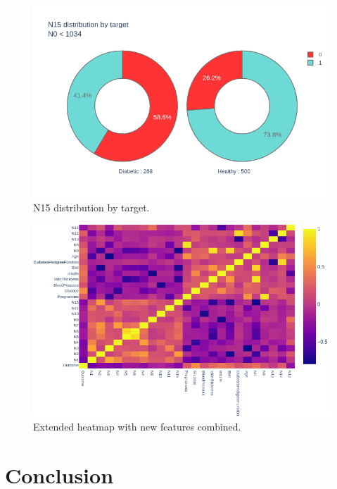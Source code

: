 \documentclass[12pt]{article}
\begin{document}
\begin{figure}[ht]
\centering
\includegraphics[width=1\textwidth]{newplot(41).png}
\caption{\label{fig:48} N15 distribution by target.}
\end{figure}

\begin{figure}[ht]
\centering
\includegraphics[width=1\textwidth]{newplot(42).png}
\caption{\label{fig:49} Extended heatmap with new features combined.}
\end{figure}

\clearpage
\newpage
\section{Conclusion}

\clearpage
\newpage
\nocite{*}


\end{document}
